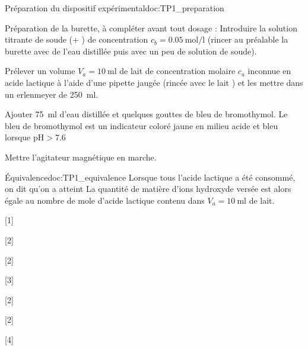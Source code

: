 \begin{doc}{Préparation du dispositif expérimental}{doc:TP1_preparation}
  \begin{protocole}
    \item Préparation de la burette, à compléter avant tout dosage :
    Introduire la solution titrante de soude (\ionSodium + \hydroxyde) de concentration $c_b = \qty{0,05}{\mol\per\litre}$ (rincer au préalable la burette avec de l’eau distillée puis avec un peu de solution de soude).
    \item Prélever un volume $V_a = \qty{10}{\ml}$ de lait de concentration molaire $c_a$ inconnue en acide lactique à l’aide d’une pipette jaugée (rincée avec le lait ) et les mettre dans un erlenmeyer de \qty{250}{\ml}.
    \item Ajouter \qty{75}{\ml} d’eau distillée et quelques gouttes
    de bleu de bromothymol. Le bleu de bromothymol est un indicateur coloré jaune en milieu acide et bleu lorsque $\text{pH} > \num{7,6}$
    \item Mettre l’agitateur magnétique en marche.
  \end{protocole}
\end{doc}


\begin{doc}{Équivalence}{doc:TP1_equivalence}
  Lorsque tous l'acide lactique a été consommé, on dit qu'on a atteint 
  La quantité de matière d’ions hydroxyde \hydroxyde versée est alors égale au nombre de mole
  d’acide lactique contenu dans $V_a = \qty{10}{\ml}$ de lait.
\end{doc}

[1]

[2]

[2]

[3]

[2]

[2]

[4]
